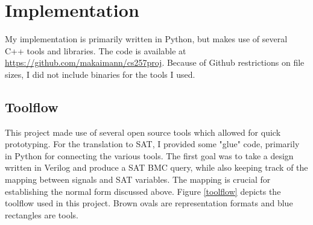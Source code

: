 \documentclass[letterpaper]{article} %
\begin{document}
\section{Implementation}
My implementation is primarily written in Python, but makes use of several C++ tools and libraries. The code is available at \url{https://github.com/makaimann/cs257proj}. Because of Github restrictions on file sizes, I did not include binaries for the tools I used.
\subsection{Toolflow}
This project made use of several open source tools which allowed for quick prototyping. For the translation to SAT, I provided some "glue" code, primarily in Python for connecting the various tools. The first goal was to take a design written in Verilog and produce a SAT BMC query, while also keeping track of the mapping between signals and SAT variables. The mapping is crucial for establishing the normal form discussed above. Figure \ref{toolflow} depicts the toolflow used in this project. Brown ovals are representation formats and blue rectangles are tools.
\end{document}
